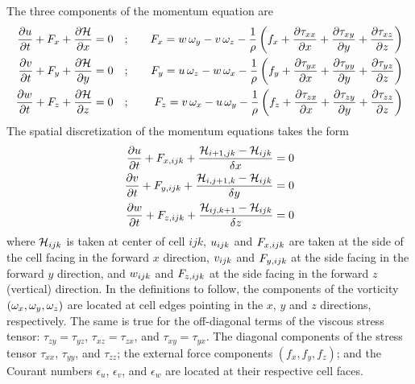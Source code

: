 \documentclass[11pt]{book}
\begin{document}
\label{themom}

The three components of the momentum equation are
\begin{eqnarray}
\frac{\partial u}{\partial t} + F_x + \frac{\partial {\cal H}}{\partial x} = 0 \quad &;& \quad
F_x = w \, \omega_y - v \, \omega_z - \frac{1}{\rho} \left( f_x
  +  \frac{\partial \tau_{xx}}{\partial x} + \frac{\partial \tau_{xy}}{\partial y} + \frac{\partial \tau_{xz}}{\partial z} \right) \\
\frac{\partial v}{\partial t} + F_y + \frac{\partial {\cal H}}{\partial y} = 0 \quad &;& \quad
F_y = u \, \omega_z - w \, \omega_x - \frac{1}{\rho} \left( f_y
  +  \frac{\partial \tau_{yx}}{\partial x} + \frac{\partial \tau_{yy}}{\partial y} + \frac{\partial \tau_{yz}}{\partial z} \right) \\
\frac{\partial w}{\partial t} + F_z + \frac{\partial {\cal H}}{\partial z} = 0 \quad &;& \quad
F_z = v \, \omega_x - u \, \omega_y - \frac{1}{\rho} \left( f_z
  +  \frac{\partial \tau_{zx}}{\partial x} + \frac{\partial \tau_{zy}}{\partial y} + \frac{\partial \tau_{zz}}{\partial z} \right)
\end{eqnarray}
The spatial discretization of the momentum equations takes the form
\begin{eqnarray}
\frac{\partial u}{\partial t} + F_{x,ijk} + \frac{{\cal H}_{i+1,jk} -{\cal H}_{ijk}}{\delta x} = 0  \label{umom} \\
\frac{\partial v}{\partial t} + F_{y,ijk} + \frac{{\cal H}_{i,j+1,k}-{\cal H}_{ijk}}{\delta y} = 0  \label{vmom} \\
\frac{\partial w}{\partial t} + F_{z,ijk} + \frac{{\cal H}_{ij,k+1} -{\cal H}_{ijk}}{\delta z} = 0  \label{wmom}
\end{eqnarray}
where ${\cal H}_{ijk}$ is taken at center of cell $ijk$,
$u_{ijk}$ and $F_{x,ijk}$ are taken at the side of the cell facing
in the forward $x$ direction, $v_{ijk}$ and $F_{y,ijk}$ at the side
facing in the forward $y$ direction, and $w_{ijk}$ and $F_{z,ijk}$
at the side facing in the forward $z$ (vertical) direction. In the
definitions to follow, the components of the vorticity $(\omega_x,\omega_y,\omega_z)$
are located at cell edges pointing in the $x$, $y$ and $z$ directions,
respectively. The same is true for the off-diagonal terms of the viscous
stress tensor: $\tau_{zy}=\tau_{yz}$, $\tau_{xz}=\tau_{zx}$, and
$\tau_{xy}=\tau_{yx}$. The diagonal components of the stress
tensor $\tau_{xx}$, $\tau_{yy}$, and $\tau_{zz}$; the external force
components $(f_x,f_y,f_z)$; and the Courant numbers
$\epsilon_u$, $\epsilon_v$, and $\epsilon_w$ are located at their
respective cell faces.
\end{document}
